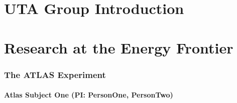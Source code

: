 \documentclass[11pt]{article}
\def\onehead#1{\part{#1}}
\def\twohead#1{\section{#1}}
\def\threehead#1{\subsection{#1}}
\begin{document}
\pagestyle{empty}
\baselineskip=23pt
\normalsize

\noindent



\newpage



\newpage

\newpage
\pagestyle{plain}
\setcounter{page}{1}


\onehead{UTA Group Introduction}


\newpage


\onehead{Research at the Energy Frontier}








%





\twohead{The ATLAS Experiment}


\threehead{Atlas Subject One (PI: PersonOne, PersonTwo)}
%
\end{document}
